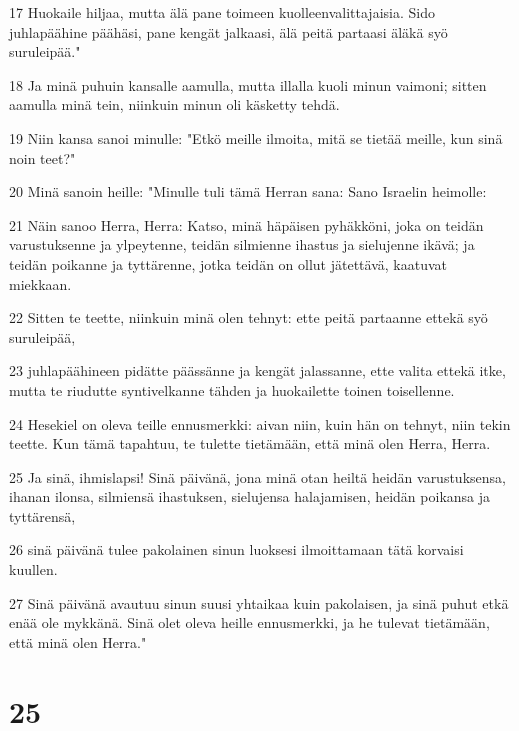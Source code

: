 \par 17 Huokaile hiljaa, mutta älä pane toimeen kuolleenvalittajaisia. Sido juhlapäähine päähäsi, pane kengät jalkaasi, älä peitä partaasi äläkä syö suruleipää."
\par 18 Ja minä puhuin kansalle aamulla, mutta illalla kuoli minun vaimoni; sitten aamulla minä tein, niinkuin minun oli käsketty tehdä.
\par 19 Niin kansa sanoi minulle: "Etkö meille ilmoita, mitä se tietää meille, kun sinä noin teet?"
\par 20 Minä sanoin heille: "Minulle tuli tämä Herran sana: Sano Israelin heimolle:
\par 21 Näin sanoo Herra, Herra: Katso, minä häpäisen pyhäkköni, joka on teidän varustuksenne ja ylpeytenne, teidän silmienne ihastus ja sielujenne ikävä; ja teidän poikanne ja tyttärenne, jotka teidän on ollut jätettävä, kaatuvat miekkaan.
\par 22 Sitten te teette, niinkuin minä olen tehnyt: ette peitä partaanne ettekä syö suruleipää,
\par 23 juhlapäähineen pidätte päässänne ja kengät jalassanne, ette valita ettekä itke, mutta te riudutte syntivelkanne tähden ja huokailette toinen toisellenne.
\par 24 Hesekiel on oleva teille ennusmerkki: aivan niin, kuin hän on tehnyt, niin tekin teette. Kun tämä tapahtuu, te tulette tietämään, että minä olen Herra, Herra.
\par 25 Ja sinä, ihmislapsi! Sinä päivänä, jona minä otan heiltä heidän varustuksensa, ihanan ilonsa, silmiensä ihastuksen, sielujensa halajamisen, heidän poikansa ja tyttärensä,
\par 26 sinä päivänä tulee pakolainen sinun luoksesi ilmoittamaan tätä korvaisi kuullen.
\par 27 Sinä päivänä avautuu sinun suusi yhtaikaa kuin pakolaisen, ja sinä puhut etkä enää ole mykkänä. Sinä olet oleva heille ennusmerkki, ja he tulevat tietämään, että minä olen Herra."

\chapter{25}


